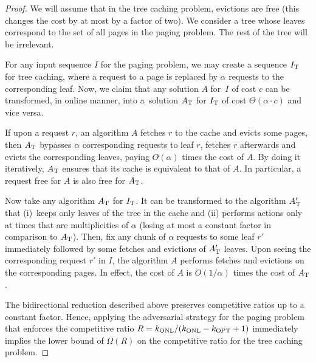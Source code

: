 \documentclass[sigconf,screen=true]{acmart}
\newcommand{\kALG}{k_\textnormal{ONL}}
\newcommand{\kOPT}{k_\textnormal{OPT}}
\begin{document}
\begin{proof}
We will assume that in the tree caching problem, evictions are free (this
changes the cost by at most by a factor of two). We consider a tree whose
leaves correspond to the set of all pages in the paging problem. The rest of
the tree will be irrelevant.

For any input sequence $I$ for the paging problem, we may create a sequence
$I_\textnormal{T}$ for tree caching, where a request to a page is replaced by
$\alpha$ requests to the corresponding leaf. Now, we claim that any solution
$A$ for~$I$ of cost $c$ can be transformed, in online manner, into a~solution
$A_\textnormal{T}$ for $I_\textnormal{T}$ of cost $\Theta(\alpha \cdot c)$ and
vice versa.

If upon a request $r$, an algorithm $A$ fetches $r$ to the cache and evicts
some pages, then $A_\textnormal{T}$ bypasses $\alpha$ corresponding requests
to leaf $r$, fetches $r$ afterwards and evicts the corresponding leaves,
paying $O(\alpha)$ times the cost of $A$. By doing it iteratively,
$A_\textnormal{T}$ ensures that its cache is equivalent to that of $A$. In
particular, a request free for $A$ is also free for $A_\textnormal{T}$.

Now take any algorithm $A_\textnormal{T}$ for $I_\textnormal{T}$. It can be
transformed to the algorithm $A_\textnormal{T}'$ that (i)~keeps only leaves of
the tree in the cache and (ii) performs actions only at times that are
multiplicities of $\alpha$ (losing at most a constant factor in comparison to
$A_\textnormal{T}$). Then, fix any chunk of $\alpha$ requests to some leaf
$r'$ immediately followed by some fetches and evictions of $A_\textnormal{T}'$
leaves. Upon seeing the corresponding request $r'$ in $I$, the algorithm $A$
performs fetches and evictions on the corresponding pages. In effect, the cost
of $A$ is $O(1/\alpha)$ times the cost of $A_\textnormal{T}$.

The bidirectional reduction described above preserves competitive ratios up to
a constant factor. Hence, applying the adversarial strategy for the paging
problem that enforces the competitive ratio  $R = \kALG/(\kALG-\kOPT+1)$
\cite{competitive-analysis} immediately implies the lower bound of $\Omega(R)$
on the competitive ratio for the tree caching problem.
\end{proof}

%
\end{document}
